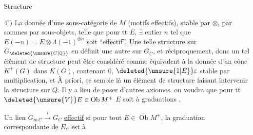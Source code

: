 \begin{center}Structure\end{center}

$4^{\circ})$ La donnée d'une sous-catégorie  de $M$ (motifs effectifs), stable par $\otimes$, par sommes par  sous-objets, telle que  pour tt $E$, $\exists$ entier $n$ tel que $E(-n)=E\otimes\Lambda(-1)^{\otimes n}$ soit ``effectif''. Une telle structure sur $G_{\deleted{\unsure{C|\mathbb Q}}}$ en définit une autre sur $G_C$, et réciproquement, donc un tel élément de structure peut être considéré comme équivalent à la donnée d'un   cône $K^+(G)$  dans  $K(G)$, contenant $0$, $\deleted{\unsure{1|E}}\varepsilon$ stable par multiplication, et
À priori, ce semble là un élément de structure faisant intervenir la structure sur $Q$. Il y a lieu de poser d'autres axiomes.  on voudra que pour tt  $\deleted{\unsure{V}}E\in\operatorname{Ob}M^+$ $E$ soit à graduations .

Un lien $G_{m\,C}\xrightarrow{i}G_C$  \uline{effectif} si pour tout $E\in\operatorname{Ob}M^+$, la graduation correspondante de $E_C$ est à

